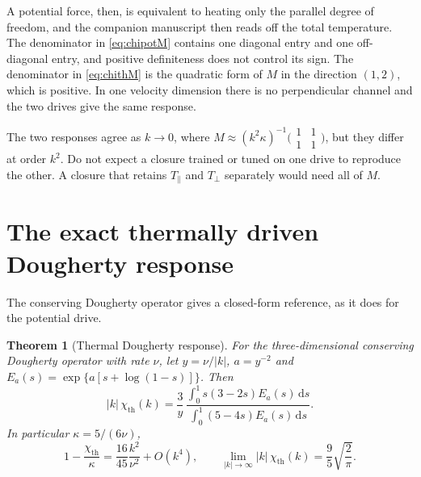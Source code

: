 \documentclass[11pt]{article}
\newcommand{\dd}{\,\mathrm d}
\newcommand{\kap}{\kappa}
\newcommand{\thr}{\mathrm{th}}
\newtheorem{theorem}{Theorem}[section]
\theoremstyle{definition}
\theoremstyle{remark}
\numberwithin{equation}{section}
\begin{document}
A potential force, then, is equivalent to heating only the
parallel degree of freedom, and the companion manuscript then reads off
the total temperature. The denominator in \eqref{eq:chipotM} contains one
diagonal entry and one off-diagonal entry, and positive definiteness does
not control its sign. The denominator in \eqref{eq:chithM} is the
quadratic form of $M$ in the direction $(1,2)$, which is positive. In one
velocity dimension there is no perpendicular channel and the two drives
give the same response.

The two responses agree as $k\to0$, where
$M\approx(k^2\kap)^{-1}\bigl(\begin{smallmatrix}1&1\\1&1\end{smallmatrix}\bigr)$,
but they differ at order $k^2$. Do not expect a closure trained or tuned
on one drive to reproduce the other. A closure that retains
$T_\parallel$ and $T_\perp$ separately would need all of $M$.

\section{The exact thermally driven Dougherty response}\label{sec:dougherty}

The conserving Dougherty operator \cite{Dougherty1964} gives a
closed-form reference, as it does for the potential drive.

\begin{theorem}[Thermal Dougherty response]\label{thm:dougherty}
For the three-dimensional conserving Dougherty operator with rate $\nu$,
let $y=\nu/|k|$, $a=y^{-2}$ and $E_a(s)=\exp\{a[s+\log(1-s)]\}$. Then
\begin{equation}
 |k|\,\chi_\thr(k)=\frac3y\,
 \frac{\int_0^1s(3-2s)E_a(s)\dd s}{\int_0^1(5-4s)E_a(s)\dd s} .
 \label{eq:dougherty}
\end{equation}
In particular $\kap=5/(6\nu)$,
\begin{equation}
 1-\frac{\chi_\thr}{\kap}=\frac{16}{45}\frac{k^2}{\nu^2}+O(k^4),
 \qquad
 \lim_{|k|\to\infty}|k|\,\chi_\thr(k)=\frac95\sqrt{\frac2\pi} .
 \label{eq:doughertylimits}
\end{equation}
\end{theorem}
\end{document}
